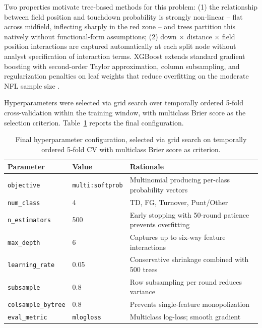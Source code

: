 \documentclass[12pt,a4paper]{article}
\begin{document}
Two properties motivate tree-based methods for this problem: (1) the relationship between field position and touchdown probability is strongly non-linear -- flat across midfield, inflecting sharply in the red zone -- and trees partition this natively without functional-form assumptions; (2) down $\times$ distance $\times$ field position interactions are captured automatically at each split node without analyst specification of interaction terms. XGBoost extends standard gradient boosting with second-order Taylor approximation, column subsampling, and regularization penalties on leaf weights that reduce overfitting on the moderate NFL sample size \citep{chen2016xgboost}.

Hyperparameters were selected via grid search over temporally ordered 5-fold cross-validation within the training window, with multiclass Brier score as the selection criterion. Table~\ref{tab:hyperparams} reports the final configuration.

\begin{table}[htbp]
  \centering
  \caption{Final hyperparameter configuration, selected via grid search on temporally ordered 5-fold CV with multiclass Brier score as criterion.}
  \label{tab:hyperparams}
  \small
  \begin{tabularx}{\textwidth}{llX}
    \toprule
    \textbf{Parameter} & \textbf{Value} & \textbf{Rationale} \\
    \midrule
    \texttt{objective} & \texttt{multi:softprob} & Multinomial producing per-class probability vectors \\
    \texttt{num\_class} & 4 & TD, FG, Turnover, Punt/Other \\
    \texttt{n\_estimators} & 500 & Early stopping with 50-round patience prevents overfitting \\
    \texttt{max\_depth} & 6 & Captures up to six-way feature interactions \\
    \texttt{learning\_rate} & 0.05 & Conservative shrinkage combined with 500 trees \\
    \texttt{subsample} & 0.8 & Row subsampling per round reduces variance \\
    \texttt{colsample\_bytree} & 0.8 & Prevents single-feature monopolization \\
    \texttt{eval\_metric} & \texttt{mlogloss} & Multiclass log-loss; smooth gradient \\
    \bottomrule
  \end{tabularx}
\end{table}
\end{document}
